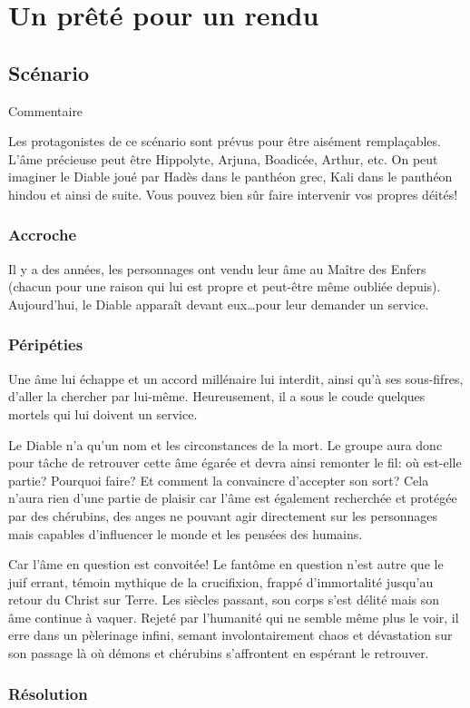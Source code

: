 \chapter{Un prêté pour un rendu}

\section{Scénario}

Commentaire

Les protagonistes de ce scénario sont prévus pour être aisément remplaçables. L'âme précieuse peut être Hippolyte, Arjuna, Boadicée, Arthur, etc. On peut imaginer le Diable joué par Hadès dans le panthéon grec, Kali dans le panthéon hindou et ainsi de suite. Vous pouvez bien sûr faire intervenir vos propres déités!

\subsection{Accroche}

Il y a des années, les personnages ont vendu leur âme au Maître des Enfers (chacun pour une raison qui lui est propre et peut-être même oubliée depuis).
Aujourd'hui, le Diable apparaît devant eux\dots pour leur demander un service.

\subsection{Péripéties}

Une âme lui échappe et un accord millénaire lui interdit, ainsi qu'à ses sous-fifres, d'aller la chercher par lui-même.
Heureusement, il a sous le coude quelques mortels qui lui doivent un service.

Le Diable n'a qu'un nom et les circonstances de la mort.
Le groupe aura donc pour tâche de retrouver cette âme égarée et devra ainsi remonter le fil: où est-elle partie?
Pourquoi faire?
Et comment la convaincre d'accepter son sort?
Cela n'aura rien d'une partie de plaisir car l'âme est également recherchée et protégée par des chérubins, des anges ne pouvant agir directement sur les personnages mais capables d'influencer le monde et les pensées des humains.

Car l'âme en question est convoitée!
Le fantôme en question n'est autre que le juif errant, témoin mythique de la crucifixion, frappé d'immortalité jusqu'au retour du Christ sur Terre.
Les siècles passant, son corps s'est délité mais son âme continue à vaquer.
Rejeté par l'humanité qui ne semble même plus le voir, il erre dans un pèlerinage infini, semant involontairement chaos et dévastation sur son passage là où démons et chérubins s'affrontent en espérant le retrouver.


\subsection{Résolution}

